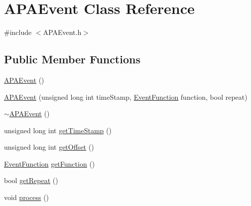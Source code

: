 \hypertarget{class_a_p_a_event}{\section{A\+P\+A\+Event Class Reference}
\label{class_a_p_a_event}
}


{\ttfamily \#include $<$A\+P\+A\+Event.\+h$>$}

\subsection*{Public Member Functions}
\begin{DoxyCompactItemize}
\item 
\hyperlink{class_a_p_a_event_ac92fedacd1abd64f91ae8bbd2e96511d}{A\+P\+A\+Event} ()
\item 
\hyperlink{class_a_p_a_event_a5721119a8c565ea8d2beafbe743dfd40}{A\+P\+A\+Event} (unsigned long int time\+Stamp, \hyperlink{_a_p_a_event_8h_a945143d383a512a7400032d931d687b8}{Event\+Function} function, bool repeat)
\item 
\hyperlink{class_a_p_a_event_ade25624573f8faa8ae98bc1930c83758}{$\sim$\+A\+P\+A\+Event} ()
\item 
unsigned long int \hyperlink{class_a_p_a_event_a63b921fe498910e2f8cdcd317db95cef}{get\+Time\+Stamp} ()
\item 
unsigned long int \hyperlink{class_a_p_a_event_aaaf9759c8a5bdb6cc5a1daca4dcf7b6f}{get\+Offset} ()
\item 
\hyperlink{_a_p_a_event_8h_a945143d383a512a7400032d931d687b8}{Event\+Function} \hyperlink{class_a_p_a_event_a328b925b682b9a2466d9f2f4b2cbbc44}{get\+Function} ()
\item 
bool \hyperlink{class_a_p_a_event_a1056010bb8759bf4184cf171c83079a8}{get\+Repeat} ()
\item 
void \hyperlink{class_a_p_a_event_a042047db43eb412b29a69ff9bbf0b3d0}{process} ()
\end{DoxyCompactItemize}



